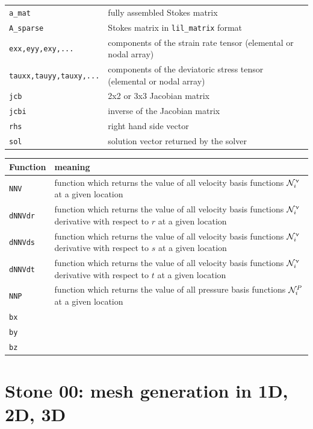 \documentclass[a4paper,11pt]{report}
\begin{document}
\begin{tabular}{p{3.5cm}p{12.5cm}}
{\tt a\_mat}  & fully assembled Stokes matrix \\
{\tt A\_sparse} & Stokes matrix in {\tt lil\_matrix} format \\
{\tt exx,eyy,exy,...} & components of the strain rate tensor (elemental or nodal array)\\
{\tt tauxx,tauyy,tauxy,...} & components of the deviatoric stress tensor (elemental or nodal array)\\
{\tt jcb} & 2x2 or 3x3 Jacobian matrix \\
{\tt jcbi} & inverse of the Jacobian matrix \\
{\tt rhs} & right hand side vector \\
{\tt sol} & solution vector returned by the solver\\
\hline
\end{tabular}

\vspace{.5cm}

\begin{tabular}{p{2cm}p{14cm}}
\hline
Function & meaning \\
\hline
{\tt NNV}    & function which returns the value of all velocity basis functions 
               ${\cal N}_i^\upnu$ at a given location\\
{\tt dNNVdr} & function which returns the value of all velocity basis functions 
               ${\cal N}_i^\upnu$ derivative with respect to $r$ at a given location\\
{\tt dNNVds} & function which returns the value of all velocity basis functions 
               ${\cal N}_i^\upnu$ derivative with respect to $s$ at a given location\\
{\tt dNNVdt} & function which returns the value of all velocity basis functions 
               ${\cal N}_i^\upnu$ derivative with respect to $t$ at a given location\\
{\tt NNP}    & function which returns the value of all pressure basis functions 
               ${\cal N}_i^P$ at a given location\\
{\tt bx} & \\
{\tt by} & \\
{\tt bz} & \\
\hline
\end{tabular}



\chapter*{Stone 00: mesh generation in 1D, 2D, 3D \label{f00}} %
\end{document}
